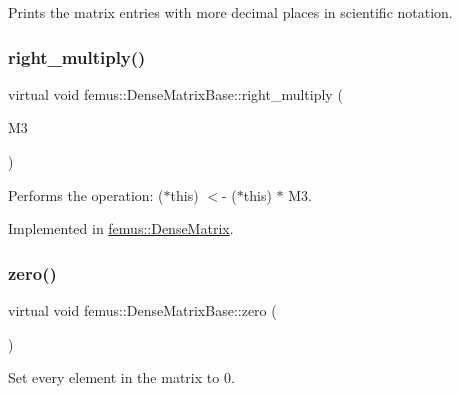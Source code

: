 Prints the matrix entries with more decimal places in scientific notation. 

\mbox{\label{classfemus_1_1_dense_matrix_base_a34072947783a0b4d797d04647cc3c646}} 
\subsubsection{\texorpdfstring{right\+\_\+multiply()}{right\_multiply()}}
{\footnotesize\ttfamily virtual void femus\+::\+Dense\+Matrix\+Base\+::right\+\_\+multiply (\begin{DoxyParamCaption}\item[{const \mbox{\hyperlink{classfemus_1_1_dense_matrix_base}{Dense\+Matrix\+Base}} \&}]{M3 }\end{DoxyParamCaption})\hspace{0.3cm}{\ttfamily [pure virtual]}}



Performs the operation\+: ($\ast$this) $<$-\/ ($\ast$this) $\ast$ M3. 



Implemented in \mbox{\hyperlink{classfemus_1_1_dense_matrix_a6de589e870d32a851fda1049b736bf99}{femus\+::\+Dense\+Matrix}}.

\mbox{\label{classfemus_1_1_dense_matrix_base_a25fc3a015ffb804afc61b8a33c9565d1}} 
\subsubsection{\texorpdfstring{zero()}{zero()}}
{\footnotesize\ttfamily virtual void femus\+::\+Dense\+Matrix\+Base\+::zero (\begin{DoxyParamCaption}{ }\end{DoxyParamCaption})\hspace{0.3cm}{\ttfamily [pure virtual]}}



Set every element in the matrix to 0. 



